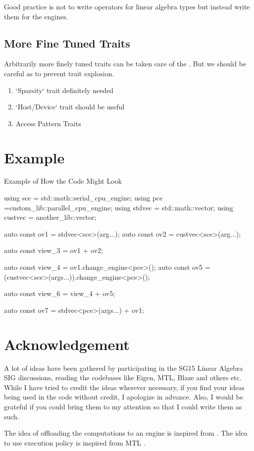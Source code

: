 \documentclass[oneside,11pt,a4paper]{jbarticle}
\begin{document}
Good practice is not to write operators for linear algebra types but instead
write them for the engines.
\subsection{More Fine Tuned Traits}
Arbitrarily more finely tuned traits can be taken care of the
.  But we should be careful as to prevent trait
explosion.
\begin{enumerate}
  \item  `Sparsity`  trait definitely needed
  \item  `Host/Device` trait should be useful
  \item  Access Pattern Traits
\end{enumerate}
\section{Example}

\begin{codecpp}{Example of How the Code Might Look}

  using sce = std::math::serial_cpu_engine;
  using pce =custom_lib::parallel_cpu_engine;
  using stdvec = std::math::vector;
  using custvec = another_lib::vector;

  auto const ov1 = stdvec<sce>(arg...);
  auto const ov2 = custvec<sce>(arg...);

  auto const view_3 = ov1 + ov2;

  auto const view_4 = ov1.change_engine<pce>();
  auto const ov5 = (custvec<sce>(args...)).change_engine<pce>();

  auto const view_6 = view_4 + ov5;

  auto const ov7 = stdvec<pce>(args...) + ov1;

\end{codecpp}
\section{Acknowledgement}
A lot of ideas have been gathered by participating in the SG15 Linear Algebra
SIG discussions, reading the codebases like Eigen, MTL, Blaze and others etc.
While I have tried to credit the ideas wherever necessary, if you find your
ideas being used in the code without credit, I apologize in advance. Also, I
would be grateful if you could bring them to my attention so that I could write
them as such.

The idea of offloading the computations to an engine is inspired from
\cite{GuyDavidson2018}. The idea to use execution policy is inspired from MTL
.


\printbibliography
\end{document}
